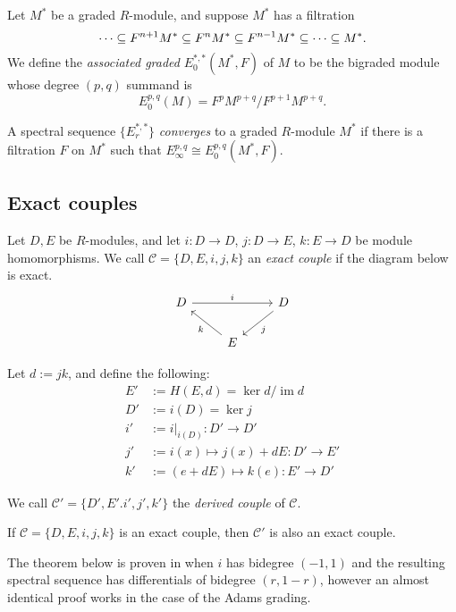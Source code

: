 \documentclass{MetricNotes2023}
\def\subq{\ensuremath\subseteq}
\DeclareMathOperator{\im}{im}
\begin{document}
Let \(M^*\) be a graded \(R\)-module, and suppose \(M^*\) has a filtration
\[\cdots \subq F^{n+1}M^*\subq F^nM^* \subq F^{n-1}M^*\subq \cdots \subq M^*.\]
We define the \textit{associated graded} \(E^{*,*}_0(M^*, F)\) of \(M\) to be the bigraded module whose degree \((p,q)\) summand is
\[E^{p,q}_0(M)= F^pM^{p+q}/F^{p+1}M^{p+q}.\]

\begin{definition}\label{2504291808}
A spectral sequence \(\{E_r^{*,*}\}\) \textit{converges} to a graded \(R\)-module \(M^*\) if there is a filtration \(F\) on \(M^*\) such that \(E_\infty^{p,q}\cong E^{p,q}_0(M^*, F)\).
\end{definition}

\subsection{Exact couples}\label{2503301333}

\begin{definition}
Let \(D, E\) be \(R\)-modules, and let \(i : D \to D\), \(j : D\to E\), \(k : E \to D\) be module homomorphisms. We call \(\mathcal{C}=\{D, E, i, j, k\}\) an \textit{exact couple} if the diagram below is exact.
\[\begin{tikzcd}
 D \arrow[rr, "i"] && D \arrow[dl, "j"] \\ 
  & E \arrow[ul, "k"] &  
 \end{tikzcd}\] 
\end{definition}

Let \(d:=jk\), and define the following:
\begin{align*}
E'&:=H(E, d)=\ker d/\im d\\
D'&:=i(D)=\ker j\\
i'&:=i|_{i(D)} : D'\to D'\\
j'&:=i(x)\mapsto j(x)+dE : D'\to E'\\
k'&:=(e+dE)\mapsto k(e) : E' \to D'
\end{align*}

We call \(\mathcal{C}'=\{D', E'. i', j', k'\}\) the \textit{derived couple} of \(\mathcal{C}\). 

\begin{proposition}
If \(\mathcal{C}=\{D, E, i, j, k\}\) is an exact couple, then \(\mathcal{C}'\) is also an exact couple.
\end{proposition}

The theorem below is proven in \autocite{spectral_sequences} when \(i\) has bidegree \((-1, 1)\) and the resulting spectral sequence has differentials of bidegree \((r, 1-r)\), however an almost identical proof works in the case of the Adams grading. 
\end{document}
